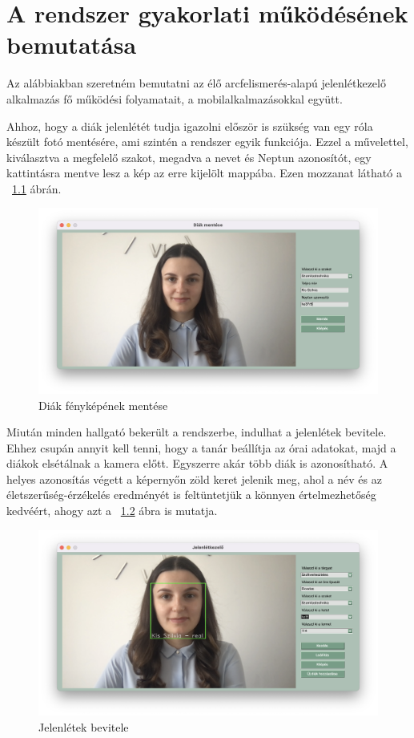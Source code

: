 \chapter{A rendszer gyakorlati működésének bemutatása} \label{chapter8}

Az alábbiakban szeretném bemutatni az élő arcfelismerés-alapú jelenlétkezelő alkalmazás fő működési folyamatait, a mobilalkalmazásokkal együtt.

Ahhoz, hogy a diák jelenlétét tudja igazolni először is szükség van egy róla készült fotó mentésére, ami szintén a rendszer egyik funkciója. Ezzel a művelettel, kiválasztva a megfelelő szakot, megadva a nevet és Neptun azonosítót, egy kattintásra mentve lesz a kép az erre kijelölt mappába. Ezen mozzanat látható a ~\ref{fig:gy1} ábrán.

\begin{figure}
	\includegraphics[width=\textwidth]{figures/gy1.png}
	\caption{Diák fényképének mentése}
	\label{fig:gy1}
\end{figure}


Miután minden hallgató bekerült a rendszerbe, indulhat a jelenlétek bevitele. Ehhez csupán annyit kell tenni, hogy a tanár beállítja az órai adatokat, majd a diákok elsétálnak a kamera előtt. Egyszerre akár több diák is azonosítható. A helyes azonosítás végett a képernyőn zöld keret jelenik meg, ahol a név és az életszerűség-érzékelés eredményét is feltüntetjük a könnyen értelmezhetőség kedvéért, ahogy azt a ~\ref{fig:gy2} ábra is mutatja.

\begin{figure}
	\includegraphics[width=\textwidth]{figures/gy2.png}
	\caption{Jelenlétek bevitele}
	\label{fig:gy2}
\end{figure}

